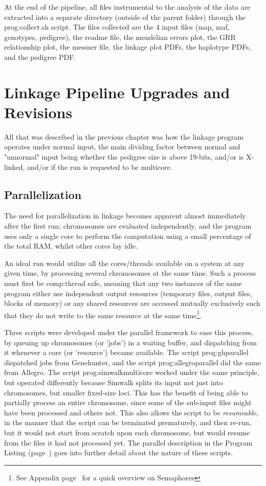 At the end of the pipeline, all files instrumental to the analysis of the data are extracted into a separate directory (outside of the parent folder) through the \gls{prog:collect.sh} script. The files collected are the 4 input files (map, maf, genotypes, pedigree), the readme file, the mendelian errors plot, the GRR relationship plot, the messner file, the linkage plot PDFs, the haplotype PDFs, and the pedigree PDF.


\section{Linkage Pipeline Upgrades and Revisions}

All that was described in the previous chapter was how the linkage program operates under normal input, the main dividing factor between normal and "unnormal" input being whether the pedigree size is above 19-bits, and/or is X-linked, and/or if the run is requested to be multicore.

\subsection{Parallelization}

The need for parallelization in linkage becomes apparent almost immediately after the first run; chromosomes are evaluated independently, and the program uses only a single core to perform the computation using a small percentage of the total RAM, whilst other cores lay idle.

An ideal run would utilize all the cores/threads available on a system at any given time, by processing several chromosomes at the same time.  Such a process must first be \gls{comp:thread safe}, meaning that any two instances of the same program either use independent output resources (temporary files, output files, blocks of memory) or any shared resources are accessed mutually exclusively such that they do not write to the same resource at the same time\footnote{See Appendix page~\pageref{ref:app:semaphores} for a quick overview on Semaphores}.

Three scripts were developed under the parallel framework to ease this process, by queuing up chromosomes (or 'jobs') in a waiting buffer, and dispatching from it whenever a core (or 'resource') became available. The script \gls{prog:ghparallel} dispatched jobs from Genehunter, and the script \gls{prog:allegroparallel} did the same from Allegro. The script \gls{prog:simwalkmulticore}\label{ref:meth:simwalkmulti} worked under the same principle, but operated differently because Simwalk splits its input not just into chromosomes, but smaller fixed-size loci. This has the benefit of being able to partially process an entire chromosome, since some of the sub-input files might have been  processed and others not. This also allows the script to be \textit{resumeable}, in the manner that the script can be terminated prematurely, and then re-run, but it would not start from scratch upon each chromosome, but would resume from the files it had not processed yet. The parallel description in the Program Listing (page~\pageref{ref:meth:proglist}) goes into further detail about the nature of these scripts.

